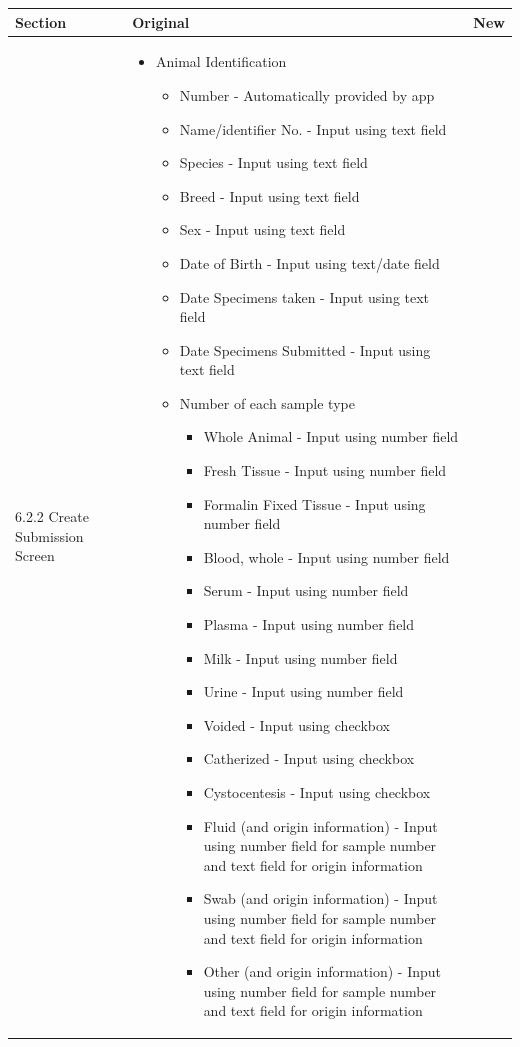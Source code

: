 \documentclass[onecolumn, draftclsnofoot,10pt, compsoc]{IEEEtran}
\begin{document}
\clearpage
\begin{table}
\begin{tabularx}{\textwidth}{|>{\setlength\hsize{.5\hsize}\setlength\linewidth{\hsize}}X|>{\setlength\hsize{1.7\hsize}\setlength\linewidth{\hsize}}X|>{\setlength\hsize{.8\hsize}\setlength\linewidth{\hsize}}X|}
\hline
Section & Original & New \\
\hline

6.2.2 Create Submission Screen
&


\begin{itemize}


\item Animal Identification
    \begin{itemize}
    \item Number - Automatically provided by app
    \item Name/identifier No. - Input using text field
    \item Species - Input using text field
    \item Breed - Input using text field
    \item Sex - Input using text field
    \item Date of Birth - Input using text/date field
	\item Date Specimens taken - Input using text field
    \item Date Specimens Submitted - Input using text field
    
    \item Number of each sample type
    
      \begin{itemize}
      \item Whole Animal - Input using number field
      \item Fresh Tissue - Input using number field
      \item Formalin Fixed Tissue - Input using number field
      \item Blood, whole - Input using number field
      \item Serum - Input using number field
      \item Plasma - Input using number field
      \item Milk - Input using number field
      \item Urine - Input using number field
      \item Voided - Input using checkbox
      \item Catherized - Input using checkbox
      \item Cystocentesis - Input using checkbox
      \item Fluid (and origin information) - Input using number field for sample number and text field for origin information
      \item Swab (and origin information) - Input using number field for sample number and text field for origin information
      \item Other (and origin information) - Input using number field for sample number and text field for origin information
      \end{itemize}
      

\end{itemize}
\end{itemize}
\end{tabularx}
\end{table}
\end{document}
